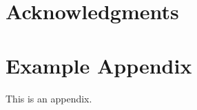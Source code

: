 \documentclass[11pt]{article}
\begin{document}
\section*{Acknowledgments}




%


\appendix

\section{Example Appendix}
\label{sec:appendix}

This is an appendix.
\end{document}
